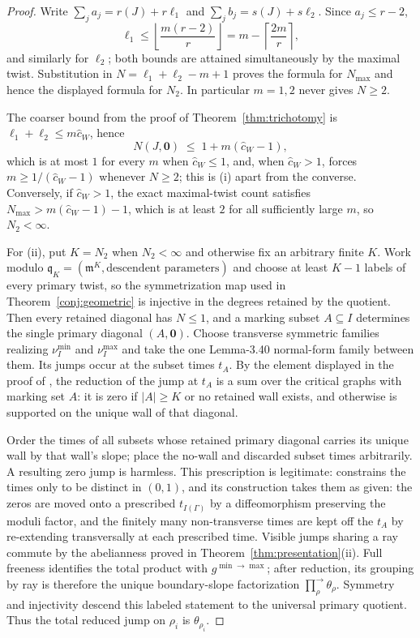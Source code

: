 \documentclass[11pt]{amsart}
\theoremstyle{definition}
\theoremstyle{remark}
\newcommand{\chat}{\hat{c}}
\begin{document}
\begin{proof}
Write $\sum_j a_j=r(J)+r\ell_1$ and
$\sum_j b_j=s(J)+s\ell_2$. Since $a_j\le r-2$,
\[
\ell_1\le\left\lfloor\frac{m(r-2)}r\right\rfloor
=m-\left\lceil\frac{2m}{r}\right\rceil,
\]
and similarly for $\ell_2$; both bounds are attained simultaneously by the
maximal twist. Substitution in
$N=\ell_1+\ell_2-m+1$ proves the formula for $N_{\max}$ and hence the displayed
formula for $N_2$. In particular $m=1,2$ never gives $N\ge2$.

The coarser bound from the proof of Theorem~\ref{thm:trichotomy} is
$\ell_{1}+\ell_{2}\le m\chat_{W}$, hence
\begin{equation}
\label{eq:Nbound}
N(J,\mathbf 0)\;\le\;1+m(\chat_{W}-1),
\end{equation}
which is at most $1$ for every $m$ when $\chat_{W}\le1$, and, when
$\chat_W>1$, forces $m\ge1/(\chat_{W}-1)$ whenever $N\ge2$; this is (i)
apart from the converse.
Conversely, if $\chat_{W}>1$, the exact maximal-twist count satisfies
$N_{\max}>m(\chat_{W}-1)-1$, which is at least $2$ for all sufficiently large
$m$, so $N_{2}<\infty$.

For (ii), put $K=N_2$ when $N_2<\infty$ and otherwise fix an arbitrary finite
$K$. Work modulo $\mathfrak q_K=(\mathfrak m^K,\text{descendent parameters})$ and choose
at least $K-1$ labels of every primary twist, so the symmetrization map used in
Theorem~\ref{conj:geometric} is injective in the degrees retained by the quotient. Then every
retained diagonal has $N\le1$, and a marking subset $A\subseteq I$ determines
the single primary diagonal $(A,\mathbf0)$. Choose transverse symmetric families
realizing $\nu_I^{\min}$ and $\nu_I^{\max}$ and take the one Lemma-3.40 normal-form
family between them. Its jumps occur at the subset times $t_A$. By the element
displayed in the proof of \cite[Thm.~5.9]{GKT}, the reduction of the jump at
$t_A$ is a sum over the critical graphs with marking set $A$: it is zero if
$|A|\ge K$ or no retained wall exists, and otherwise is supported on the unique
wall of that diagonal.

Order the times of all subsets whose retained primary diagonal carries its
unique wall by that wall's slope; place the no-wall and discarded subset times
arbitrarily. A resulting zero jump is harmless. This prescription is legitimate:
\cite[Lem.~3.40]{GKT} constrains the times only to be distinct in $(0,1)$, and its
construction takes them as given: the zeros are moved onto a prescribed
$t_{I(\Gamma)}$ by a diffeomorphism preserving the moduli factor, and the
finitely many non-transverse times are kept off the $t_{A}$ by re-extending
transversally at each prescribed time. Visible jumps sharing a ray commute by the abelianness proved in
Theorem~\ref{thm:presentation}(ii). Full freeness identifies the total product
with $g^{\min\to\max}$; after reduction, its grouping by ray is therefore the
unique boundary-slope factorization
$\prod^{\rightarrow}_{\rho}\theta_{\rho}$. Symmetry and injectivity descend
this labeled statement to the universal primary quotient. Thus the total
reduced jump on $\rho_i$ is $\theta_{\rho_i}$.
\end{proof}
\end{document}

